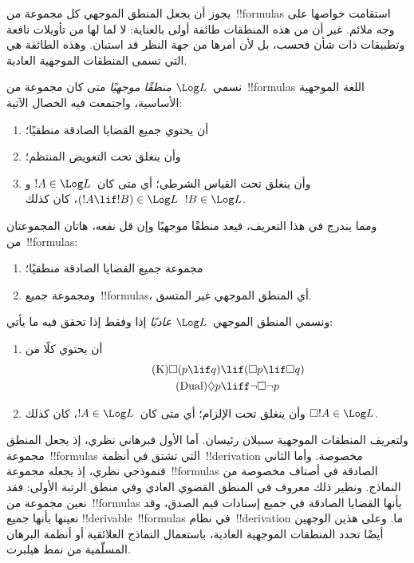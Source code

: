 \documentclass[../../../include/open-logic-section]{subfiles}
\begin{document}


يجوز أن يجعل المنطق الموجهي كل مجموعة من~!!{formula}s استقامت خواصها
على وجه ملائم. غير أن من هذه المنطقات طائفة أولى بالعناية: لا لما لها
من تأويلات نافعة وتطبيقات ذات شأن فحسب، بل لأن أمرها من جهة النظر قد
استبان. وهذه الطائفة هي التي تسمى المنطقات الموجهية العادية.

\begin{defn}
نسمي~$\Log L$ \emph{منطقًا موجهيًا} متى كان مجموعة من~!!{formula}s
اللغة الموجهية الأساسية، واجتمعت فيه الخصال الآتية:
\begin{enumerate}
\item أن يحتوي جميع القضايا الصادقة منطقيًا؛
\item وأن ينغلق تحت التعويض المنتظم؛
\item وأن ينغلق تحت القياس الشرطي؛ أي متى كان~$!A \in \Log L$ و
  $(!A \lif !B) \in \Log L$، كان كذلك~$!B \in \Log L$.
\end{enumerate}
\end{defn}

\begin{ex}
ومما يندرج في هذا التعريف، فيعد منطقًا موجهيًا وإن قل نفعه، هاتان
المجموعتان من~!!{formula}s:
\begin{enumerate}
\item مجموعة جميع القضايا الصادقة منطقيًا؛
\item ومجموعة جميع~!!{formula}s، أي المنطق الموجهي غير المتسق.
\end{enumerate}
\end{ex}

\begin{defn}
ونسمي المنطق الموجهي~$\Log L$ \emph{عاديًا} إذا وفقط إذا تحقق فيه ما يأتي:
\begin{enumerate}
\item أن يحتوي كلًا من
\begin{align}
\tag{K} \Box(p \lif q) & \lif (\Box p \lif \Box q) \\
\tag{Dual} \Diamond p & \liff \lnot \Box \lnot p
\end{align}
\item وأن ينغلق تحت الإلزام؛ أي متى كان~$!A \in \Log L$، كان كذلك
  $\Box !A \in \Log L$.
\end{enumerate}
\end{defn}

ولتعريف المنطقات الموجهية سبيلان رئيسان. أما الأول فبرهاني نظري، إذ
يجعل المنطق مجموعة~!!{formula}s التي تشتق في أنظمة~!!{derivation}
مخصوصة. وأما الثاني فنموذجي نظري، إذ يجعله مجموعة~!!{formula}s الصادقة
في أصناف مخصوصة من النماذج. ونظير ذلك معروف في المنطق القضوي العادي وفي
منطق الرتبة الأولى: فقد نعين مجموعة من~!!{formula}s بأنها القضايا
الصادقة في جميع إسنادات قيم الصدق، وقد نعينها بأنها جميع
!!{derivable}~!!{formula}s في نظام~!!{derivation} ما. وعلى هذين
الوجهين أيضًا تحدد المنطقات الموجهية العادية، باستعمال النماذج
العلائقية أو أنظمة البرهان المسلّمية من نمط هيلبرت.
\end{document}

